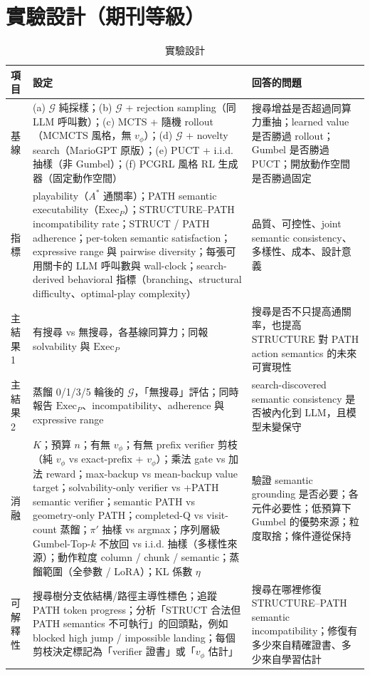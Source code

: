 \documentclass[11pt,a4paper]{article}
\newcommand{\Gp}{\mathcal{G}}
\begin{document}
\section{實驗設計（期刊等級）}
\begin{table}[H]
\centering\small
\caption{實驗設計}\label{tab:exp}
\begin{tabularx}{\textwidth}{>{\raggedright\arraybackslash}p{2.3cm}XX}
\toprule
項目 & 設定 & 回答的問題 \\
\midrule
基線 & (a) $\Gp$ 純採樣；(b) $\Gp$ + rejection sampling（同 LLM 呼叫數）；(c) MCTS + 隨機 rollout（MCMCTS 風格，無 $v_\phi$）；(d) $\Gp$ + novelty search（MarioGPT 原版）；(e) PUCT + i.i.d. 抽樣（非 Gumbel）；(f) PCGRL 風格 RL 生成器（固定動作空間） & 搜尋增益是否超過同算力重抽；learned value 是否勝過 rollout；Gumbel 是否勝過 PUCT；開放動作空間是否勝過固定 \\
指標 & playability（$A^*$ 通關率）；PATH semantic executability（$\mathrm{Exec}_{P}$）；STRUCTURE--PATH incompatibility rate；STRUCT / PATH adherence；per-token semantic satisfaction；expressive range 與 pairwise diversity；每張可用關卡的 LLM 呼叫數與 wall-clock；search-derived behavioral 指標（branching、structural difficulty、optimal-play complexity） & 品質、可控性、joint semantic consistency、多樣性、成本、設計意義 \\
主結果 1 & 有搜尋 vs 無搜尋，各基線同算力；同報 solvability 與 $\mathrm{Exec}_{P}$ & 搜尋是否不只提高通關率，也提高 STRUCTURE 對 PATH action semantics 的未來可實現性 \\
主結果 2 & 蒸餾 0/1/3/5 輪後的 $\Gp$，「無搜尋」評估；同時報告 $\mathrm{Exec}_{P}$、incompatibility、adherence 與 expressive range & search-discovered semantic consistency 是否被內化到 LLM，且模型未變保守 \\
消融 & $K$；預算 $n$；有無 $v_\phi$；有無 prefix verifier 剪枝（純 $v_\phi$ vs exact-prefix + $v_\phi$）；乘法 gate vs 加法 reward；max-backup vs mean-backup value target；solvability-only verifier vs +PATH semantic verifier；semantic PATH vs geometry-only PATH；completed-Q vs visit-count 蒸餾；$\pi'$ 抽樣 vs argmax；序列層級 Gumbel-Top-$k$ 不放回 vs i.i.d. 抽樣（多樣性來源）；動作粒度 column / chunk / semantic；蒸餾範圍（全參數 / LoRA）；KL 係數 $\eta$ & 驗證 semantic grounding 是否必要；各元件必要性；低預算下 Gumbel 的優勢來源；粒度取捨；條件遵從保持 \\
可解釋性 & 搜尋樹分支依結構/路徑主導性標色；追蹤 PATH token progress；分析「STRUCT 合法但 PATH semantics 不可執行」的回頭點，例如 blocked high jump / impossible landing；每個剪枝決定標記為「verifier 證書」或「$v_\phi$ 估計」 & 搜尋在哪裡修復 STRUCTURE--PATH semantic incompatibility；修復有多少來自精確證書、多少來自學習估計 \\

\end{tabularx}
\end{table}
\end{document}
